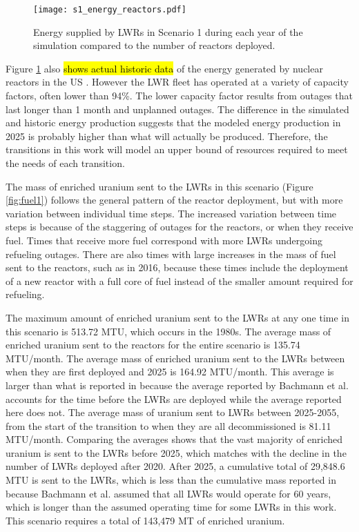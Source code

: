 \begin{figure}
    \centering
    \texttt{[image: s1\_energy\_reactors.pdf]}
    \caption{Energy supplied by \glspl{LWR} in Scenario 1 during each year of
    the simulation compared to the number of reactors deployed.}
    \label{fig:energy_reactor1}
\end{figure}

Figure \ref{fig:energy_reactor1} also \hl{shows actual historic data} of the 
energy generated by nuclear reactors in the US \cite{noauthor_total_2022}.
 However 
the \gls{LWR} fleet has operated at a variety of capacity factors, often 
lower than 94\%. The lower capacity factor results from outages that last 
longer than 1 month and unplanned outages. The difference 
in the simulated and historic energy production suggests that the modeled 
energy production in 2025 is probably higher than what will actually 
be produced. Therefore, the transitions in this work will model an upper 
bound of resources required to meet the needs of each transition. 

The mass of enriched uranium sent to the \glspl{LWR} in this scenario (Figure 
\ref{fig:fuel1}) follows the general pattern of the reactor deployment, but with 
more variation between individual time steps. The increased variation between 
time steps is because of the staggering of outages for the reactors, or when 
they receive fuel. Times that receive more fuel correspond with more 
\glspl{LWR} undergoing refueling outages. There are also times with large 
increases in the mass of fuel 
sent to the reactors, such as in 2016, because these times include the deployment 
of a new reactor with a full core of fuel instead of the smaller amount 
required for refueling.

The maximum amount of enriched uranium sent to the \glspl{LWR} at any one 
time in this scenario is 513.72 MTU, which occurs in the 1980s. The 
average mass of enriched uranium sent to 
the reactors for the entire scenario is 135.74 MTU/month. The average mass of 
enriched uranium sent to the \glspl{LWR} between when they are first deployed 
and 2025 is 164.92 MTU/month. This average is larger than what is reported in 
\cite{bachmann_enrichment_2021} because the average reported by 
Bachmann et al. accounts for the time before the \glspl{LWR} are  
deployed while the average reported here does not. The average mass of 
uranium sent to \glspl{LWR} between 2025-2055, from the start of the transition 
to when they are all decommissioned is 81.11 MTU/month. Comparing the averages 
shows that the vast majority of enriched uranium is sent to the \glspl{LWR} 
before 2025, which matches with the decline in the number of \glspl{LWR} 
deployed after 2020. After 2025, a cumulative total of 29,848.6 MTU is 
sent to the \glspl{LWR},
which is less than the cumulative mass reported in \cite{bachmann_enrichment_2021}
because Bachmann et al. assumed that all \glspl{LWR} would operate for 60 years, 
which is longer than the assumed operating time for some \glspl{LWR} in 
this work. This scenario requires a total of 143,479 MT of enriched uranium.

